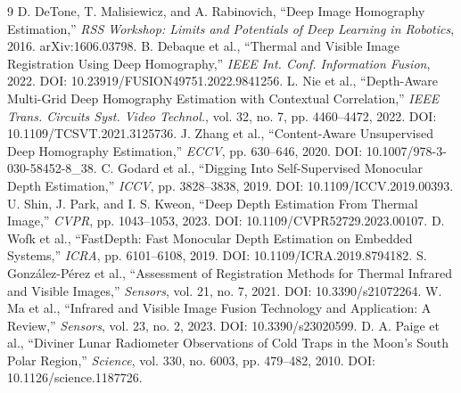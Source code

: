 \documentclass[12pt]{article}
\begin{document}
\begin{thebibliography}{9}
 D. DeTone, T. Malisiewicz, and A. Rabinovich, ``Deep Image Homography Estimation,'' \textit{RSS Workshop: Limits and Potentials of Deep Learning in Robotics}, 2016. arXiv:1606.03798.
 B. Debaque et al., ``Thermal and Visible Image Registration Using Deep Homography,'' \textit{IEEE Int. Conf. Information Fusion}, 2022. DOI: 10.23919/FUSION49751.2022.9841256.
 L. Nie et al., ``Depth-Aware Multi-Grid Deep Homography Estimation with Contextual Correlation,'' \textit{IEEE Trans. Circuits Syst. Video Technol.}, vol. 32, no. 7, pp. 4460--4472, 2022. DOI: 10.1109/TCSVT.2021.3125736.
 J. Zhang et al., ``Content-Aware Unsupervised Deep Homography Estimation,'' \textit{ECCV}, pp. 630--646, 2020. DOI: 10.1007/978-3-030-58452-8\_38.
 C. Godard et al., ``Digging Into Self-Supervised Monocular Depth Estimation,'' \textit{ICCV}, pp. 3828--3838, 2019. DOI: 10.1109/ICCV.2019.00393.
 U. Shin, J. Park, and I. S. Kweon, ``Deep Depth Estimation From Thermal Image,'' \textit{CVPR}, pp. 1043--1053, 2023. DOI: 10.1109/CVPR52729.2023.00107.
 D. Wofk et al., ``FastDepth: Fast Monocular Depth Estimation on Embedded Systems,'' \textit{ICRA}, pp. 6101--6108, 2019. DOI: 10.1109/ICRA.2019.8794182.
 S. González-Pérez et al., ``Assessment of Registration Methods for Thermal Infrared and Visible Images,'' \textit{Sensors}, vol. 21, no. 7, 2021. DOI: 10.3390/s21072264.
 W. Ma et al., ``Infrared and Visible Image Fusion Technology and Application: A Review,'' \textit{Sensors}, vol. 23, no. 2, 2023. DOI: 10.3390/s23020599.
 D. A. Paige et al., ``Diviner Lunar Radiometer Observations of Cold Traps in the Moon's South Polar Region,'' \textit{Science}, vol. 330, no. 6003, pp. 479--482, 2010. DOI: 10.1126/science.1187726.
\end{thebibliography}
\end{document}
